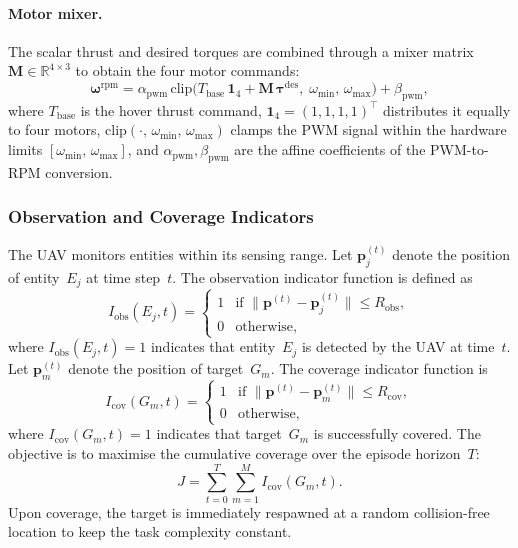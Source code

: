 \paragraph{Motor mixer.}
The scalar thrust and desired torques are combined through a mixer matrix
$\mathbf{M} \in \mathbb{R}^{4\times3}$ to obtain the four motor commands:
\begin{equation}
  \boldsymbol{\omega}^{\mathrm{rpm}} =
    \alpha_{\mathrm{pwm}}\,\mathrm{clip}\!\bigl(
      T_{\mathrm{base}}\,\mathbf{1}_4
      + \mathbf{M}\,\boldsymbol{\tau}^{\mathrm{des}},\;
      \omega_{\min},\, \omega_{\max}
    \bigr)
    + \beta_{\mathrm{pwm}},
  \label{eq:mixer}
\end{equation}
where $T_{\mathrm{base}}$ is the hover thrust command,
$\mathbf{1}_4 = (1,1,1,1)^{\top}$ distributes it equally to four motors,
$\mathrm{clip}(\cdot,\, \omega_{\min},\, \omega_{\max})$ clamps the PWM signal
within the hardware limits $[\omega_{\min},\, \omega_{\max}]$, and
$\alpha_{\mathrm{pwm}}, \beta_{\mathrm{pwm}}$ are the affine coefficients of
the PWM-to-RPM conversion.

\subsubsection{Observation and Coverage Indicators}

The UAV monitors entities within its sensing range.
Let $\mathbf{p}_j^{(t)}$ denote the position of entity~$E_j$ at time step~$t$.
The observation indicator function is defined as
\begin{equation}
  I_{\mathrm{obs}}(E_j, t) =
  \begin{cases}
    1 & \text{if } \lVert\mathbf{p}^{(t)} - \mathbf{p}_j^{(t)}\rVert
        \le R_{\mathrm{obs}}, \\
    0 & \text{otherwise},
  \end{cases}
  \label{eq:obs_indicator}
\end{equation}
where $I_{\mathrm{obs}}(E_j, t) = 1$ indicates that entity~$E_j$ is detected
by the UAV at time~$t$.
Let $\mathbf{p}_m^{(t)}$ denote the position of target~$G_m$.
The coverage indicator function is
\begin{equation}
  I_{\mathrm{cov}}(G_m, t) =
  \begin{cases}
    1 & \text{if } \lVert\mathbf{p}^{(t)} - \mathbf{p}_m^{(t)}\rVert
        \le R_{\mathrm{cov}}, \\
    0 & \text{otherwise},
  \end{cases}
  \label{eq:cov_indicator}
\end{equation}
where $I_{\mathrm{cov}}(G_m, t) = 1$ indicates that target~$G_m$ is
successfully covered.
The objective is to maximise the cumulative coverage over the episode
horizon~$T$:
\begin{equation}
  J = \sum_{t=0}^{T} \sum_{m=1}^{M} I_{\mathrm{cov}}(G_m, t).
  \label{eq:coverage_obj}
\end{equation}
Upon coverage, the target is immediately respawned at a random collision-free
location to keep the task complexity constant.

